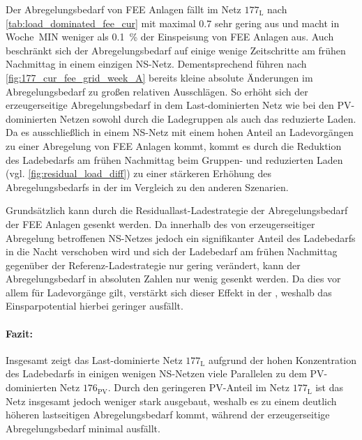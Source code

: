 Der Abregelungsbedarf von \gls{FEE} Anlagen fällt im Netz \(177_{\text{L}}\) nach \autoref{tab:load_dominated_fee_cur} mit maximal \SI{0.7}{\mwh} sehr gering aus und macht in Woche~MIN weniger als \SI{0.1}{\percent} der Einspeisung von \gls{FEE} Anlagen aus.
Auch beschränkt sich der Abregelungsbedarf auf einige wenige Zeitschritte am frühen Nachmittag in einem einzigen \gls{NS}-Netz.
Dementsprechend führen nach \autoref{fig:177_cur_fee_grid_week_A} bereits kleine absolute Änderungen im Abregelungsbedarf zu großen relativen Ausschlägen.
So erhöht sich der erzeugerseitige Abregelungsbedarf in dem Last-dominierten Netz wie bei den \gls{PV}-dominierten Netzen sowohl durch die Ladegruppen als auch das reduzierte Laden.
Da es ausschließlich in einem \gls{NS}-Netz mit einem hohen Anteil an Ladevorgängen \zH zu einer Abregelung von \gls{FEE} Anlagen kommt, kommt es durch die Reduktion des Ladebedarfs am frühen Nachmittag beim Gruppen- und reduzierten Laden (vgl. \autoref{fig:residual_load_diff}) zu einer stärkeren Erhöhung des Abregelungsbedarfs in der \SzeFirmenparkplatz im Vergleich zu den anderen Szenarien.



Grundsätzlich kann durch die Residuallast-Ladestrategie der Abregelungsbedarf der \gls{FEE} Anlagen gesenkt werden.
Da innerhalb des von erzeugerseitiger Abregelung betroffenen \gls{NS}-Netzes jedoch ein signifikanter Anteil des Ladebedarfs in die Nacht verschoben wird und sich der Ladebedarf am frühen Nachmittag gegenüber der Referenz-Ladestrategie nur gering verändert, kann der Abregelungsbedarf in absoluten Zahlen nur wenig gesenkt werden.
Da dies vor allem für Ladevorgänge \zH gilt, verstärkt sich dieser Effekt in der \SzeFirmenparkplatzdot, weshalb das Einsparpotential hierbei geringer ausfällt.


\paragraph{Fazit:}

Insgesamt zeigt das Last-dominierte Netz \(177_{\text{L}}\) aufgrund der hohen Konzentration des Ladebedarfs in einigen wenigen \gls{NS}-Netzen viele Parallelen zu dem \gls{PV}-dominierten Netz \(176_{\text{PV}}\).
Durch den geringeren \gls{PV}-Anteil im Netz \(177_{\text{L}}\) ist das Netz insgesamt jedoch weniger stark ausgebaut, weshalb es zu einem deutlich höheren lastseitigen Abregelungsbedarf kommt, während der erzeugerseitige Abregelungsbedarf minimal ausfällt.\medskip

